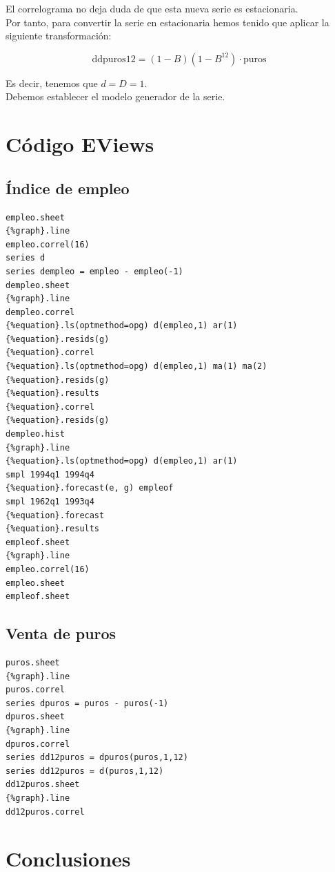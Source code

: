 \documentclass[12pt,a4paper,twoside,openright,titlepage,final]{article}
\begin{document}
El correlograma no deja duda de que esta nueva serie es estacionaria.\\

Por tanto, para convertir la serie en estacionaria hemos tenido que aplicar la siguiente transformación:

\[ \text{ddpuros12} = (1-B)(1-B^{12}) \cdot \text{puros} \]

Es decir, tenemos que $d=D=1$.\\

Debemos establecer el modelo generador de la serie.

\clearpage
\section{Código EViews}

\subsection{Índice de empleo}

\begin{verbatim}
empleo.sheet
{%graph}.line
empleo.correl(16)
series d
series dempleo = empleo - empleo(-1)
dempleo.sheet
{%graph}.line
dempleo.correl
{%equation}.ls(optmethod=opg) d(empleo,1) ar(1)
{%equation}.resids(g)
{%equation}.correl
{%equation}.ls(optmethod=opg) d(empleo,1) ma(1) ma(2)
{%equation}.resids(g)
{%equation}.results
{%equation}.correl
{%equation}.resids(g)
dempleo.hist
{%graph}.line
{%equation}.ls(optmethod=opg) d(empleo,1) ar(1)
smpl 1994q1 1994q4
{%equation}.forecast(e, g) empleof
smpl 1962q1 1993q4
{%equation}.forecast 
{%equation}.results
empleof.sheet
{%graph}.line
empleo.correl(16)
empleo.sheet
empleof.sheet
\end{verbatim}

\subsection{Venta de puros}


\begin{verbatim}
puros.sheet
{%graph}.line
puros.correl
series dpuros = puros - puros(-1)
dpuros.sheet
{%graph}.line
dpuros.correl
series dd12puros = dpuros(puros,1,12)
series dd12puros = d(puros,1,12)
dd12puros.sheet
{%graph}.line
dd12puros.correl
\end{verbatim}


\section{Conclusiones}
\end{document}
